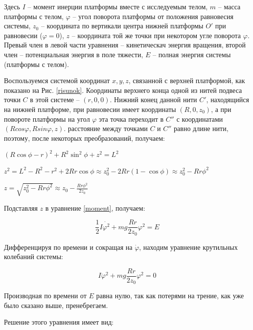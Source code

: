 	Здесь $I$ -- момент инерции платформы вместе с исследуемым телом, $m$ -- масса платформы с телом, $\varphi$ -- угол поворота платформы от положения равновесия системы, $z_0$ -- координата по вертикали центра нижней платформы $O'$  при равновесии ($\varphi = 0$), $z$ -- координата той же точки при некотором угле поворота $\varphi$. Превый член в левой части уравнения -- кинетическач энергия вращения, второй член -- потенциальная энергия в поле тяжести, $E$ -- полная энергия системы (платформы с телом).
	
	Воспользуемся системой координат $x, y, z$, связанной с верхней платформой, как показано на Рис. \ref{risunok}. Координаты верхнего конца одной из нитей подвеса точки $C$ в этой системе -- $(r, 0, 0)$. Нижний конец данной нити $C'$, находящийся на нижней платформе, при равновесии имеет координаты $(R, 0, z_0)$, а при повороте платформы на угол $\varphi$ эта точка переходит в $C''$ с координатами $(Rcos\varphi, Rsin\varphi, z)$. расстояние между точками $C$ и $C''$ равно длине нити, поэтому, после некоторых преобразований, получаем: 
	
	\begin{center}
		\begin{spacing}{1.6}
			$ (R\cos\phi - r)^2 + R^2\sin^2\phi + z^2 = L^2 $
			
			$ z^2 = L^2 - R^2 - r^2 + 2Rr\cos\phi \approx z^2_{0} - 2Rr(1 - \cos\phi) \approx z^2_{0} - Rr\phi^2 $
			
			$ z = \sqrt{z^2_{0} - Rr\phi^2} \approx z_{0} - \frac{Rr\phi^2}{2z_{0}} $
		\end{spacing}
	\end{center}
	
	Подставляя $z$ в уравнение \eqref{moment}, получаем:
	
	\begin{equation}
		\frac{1}{2}I\dot{\varphi^2} + mg \frac{Rr}{2z_0}\varphi^2 = E
	\end{equation}
	
	Дифференцируя по времени и сокращая на $\dot\varphi$, находим уравнение крутильных колебаний системы:
	
	\begin{equation}
		I\ddot\varphi^2 + mg\frac{Rr}{2z_0}\varphi^2 = 0
	\end{equation}
	
	Производная по времени от $E$ равна нулю, так как потерями на трение, как уже было сказано выше, пренебрегаем.
	
	Решение этого уравнения имеет вид:
	
